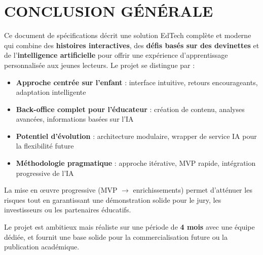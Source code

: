 \documentclass[12pt,a4paper]{article}
\begin{document}
\section{CONCLUSION GÉNÉRALE}

Ce document de spécifications décrit une solution EdTech complète et moderne qui combine des \textbf{histoires interactives}, des \textbf{défis basés sur des devinettes} et de l'\textbf{intelligence artificielle} pour offrir une expérience d'apprentissage personnalisée aux jeunes lecteurs. Le projet se distingue par :

\begin{itemize}
    \item \textbf{Approche centrée sur l'enfant} : interface intuitive, retours encourageants, adaptation intelligente
    \item \textbf{Back-office complet pour l'éducateur} : création de contenu, analyses avancées, informations basées sur l'IA
    \item \textbf{Potentiel d'évolution} : architecture modulaire, wrapper de service IA pour la flexibilité future
    \item \textbf{Méthodologie pragmatique} : approche itérative, MVP rapide, intégration progressive de l'IA
\end{itemize}

La mise en œuvre progressive (MVP $\rightarrow$ enrichissements) permet d'atténuer les risques tout en garantissant une démonstration solide pour le jury, les investisseurs ou les partenaires éducatifs.

Le projet est ambitieux mais réaliste sur une période de \textbf{4 mois} avec une équipe dédiée, et fournit une base solide pour la commercialisation future ou la publication académique.
\end{document}
